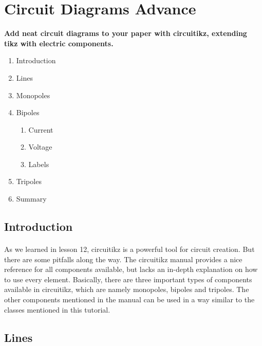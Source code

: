 
\maketitle
\newpage
\section{Circuit Diagrams Advance}
  \textbf{
    Add neat circuit diagrams to your paper with circuitikz, extending tikz with electric components.
  }
  \begin{enumerate} %
    \item Introduction
    \item Lines
    \item Monopoles
    \item Bipoles
    \begin{enumerate} %
      \item Current
      \item Voltage
      \item Labels
    \end{enumerate} 
    \item Tripoles
    \item Summary
  \end{enumerate} 
  
  \subsection{Introduction}
  \paragraph{}
  As we learned in lesson 12, circuitikz is a powerful tool for circuit creation. But there are some pitfalls along the way. The circuitikz manual provides a nice reference for all components available, but lacks an in-depth explanation on how to use every element. Basically, there are three important types of components available in circuitikz, which are namely monopoles, bipoles and tripoles. The other components mentioned in the manual can be used in a way similar to the classes mentioned in this tutorial.

  \subsection{Lines}
